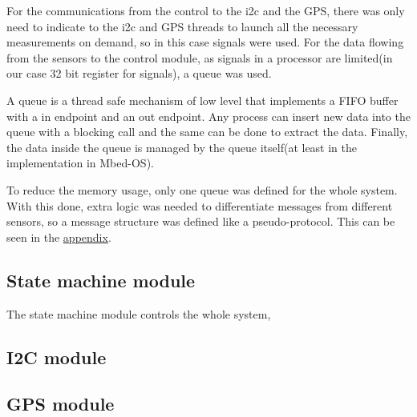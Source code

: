 For the communications from the control to the \acrshort{i2c} and the GPS, there was only need to indicate to the \acrshort{i2c} and GPS threads to launch all the necessary measurements on demand, so in this case signals were used.
For the data flowing from the sensors to the control module, as signals in a processor are limited(in our case 32 bit register for signals), a queue was used.

A queue is a thread safe mechanism of low level that implements a FIFO buffer with a in endpoint and an out endpoint. Any process can insert new data into the queue with a blocking call and the same can be done to extract the data. Finally, the data 
inside the queue is managed by the queue itself(at least in the implementation in Mbed-OS).

To reduce the memory usage, only one queue was defined for the whole system. With this done, extra logic was needed to differentiate messages from different sensors, so a message structure was defined like a pseudo-protocol. This can be seen in the \hyperref[appendix]{appendix}.

\subsection{State machine module}
The state machine module controls the whole system, 
\subsection{I2C module}

\subsection{GPS module}
\clearpage
